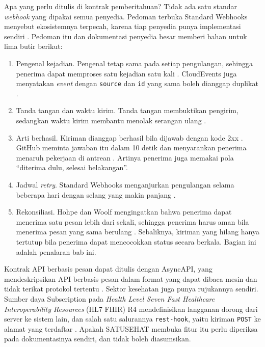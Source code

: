 Apa yang perlu ditulis di kontrak pemberitahuan? Tidak ada satu standar \textit{webhook} yang dipakai semua penyedia. Pedoman
terbuka Standard Webhooks menyebut ekosistemnya terpecah, karena tiap penyedia punya implementasi sendiri
\cite{c05-standardwebhooks}. Pedoman itu dan dokumentasi penyedia besar memberi bahan untuk lima butir berikut:
\begin{enumerate}
  \item Pengenal kejadian. Pengenal tetap sama pada setiap pengulangan, sehingga penerima dapat memproses satu kejadian satu kali
        \cite{c05-standardwebhooks}. CloudEvents juga menyatakan \textit{event} dengan \texttt{source} dan \texttt{id} yang sama
        boleh dianggap duplikat \cite{c05-cloudevents}.
  \item Tanda tangan dan waktu kirim. Tanda tangan membuktikan pengirim, sedangkan waktu kirim membantu menolak serangan ulang
        \cite{c05-standardwebhooks}.
  \item Arti berhasil. Kiriman dianggap berhasil bila dijawab dengan kode 2xx \cite{c05-standardwebhooks}. GitHub meminta jawaban
        itu dalam 10 detik dan menyarankan penerima menaruh pekerjaan di antrean \cite{c05-github-webhooks}. Artinya penerima juga
        memakai pola ``diterima dulu, selesai belakangan''.
  \item Jadwal \textit{retry}. Standard Webhooks menganjurkan pengulangan selama beberapa hari dengan selang yang makin panjang
        \cite{c05-standardwebhooks}.
  \item Rekonsiliasi. Hohpe dan Woolf mengingatkan bahwa penerima dapat menerima satu pesan lebih dari sekali, sehingga penerima
        harus aman bila menerima pesan yang sama berulang \cite{c05-hohpe2003eip}. Sebaliknya, kiriman yang hilang hanya tertutup
        bila penerima dapat mencocokkan status secara berkala. Bagian ini adalah penalaran bab ini.
\end{enumerate}

Kontrak API berbasis pesan dapat ditulis dengan AsyncAPI, yang mendeskripsikan API berbasis pesan dalam format yang dapat dibaca
mesin dan tidak terikat protokol tertentu \cite{asyncapi31}. Sektor kesehatan juga punya rujukannya sendiri. Sumber daya
Subscription pada \textit{Health Level Seven Fast Healthcare Interoperability Resources} (HL7 FHIR) R4 mendefinisikan langganan
dorong dari server ke sistem lain, dan salah satu salurannya \texttt{rest-hook}, yaitu kiriman \texttt{POST} ke alamat yang terdaftar
\cite{fhir-r4}. Apakah SATUSEHAT membuka fitur itu perlu diperiksa pada dokumentasinya sendiri, dan tidak boleh diasumsikan.

